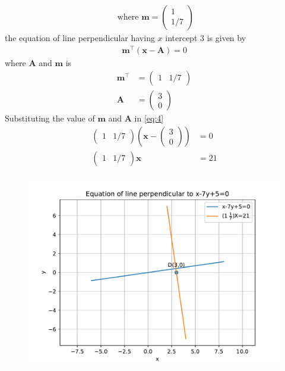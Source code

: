 \documentclass[12pt]{article}
\providecommand{\brak}[1]{\ensuremath{\left(#1\right)}}
\newcommand{\myvec}[1]{\ensuremath{\begin{pmatrix}#1\end{pmatrix}}}
\let\vec\mathbf
\begin{document}
\begin{enumerate}
\begin{align}
	\text{ where }
		\vec{m} = \myvec{1\\1/7}
\end{align}
the equation of line perpendicular having $x$ intercept $3$ is given by 
\begin{align}
	\vec{m}^\top\brak{\vec{x}-\vec{A}}=0
\end{align}
		where $\vec{A}$ and $\vec{m}$ is 
\begin{align}
	\vec{m}^\top &=\myvec{1 & 1/7}\\
	\vec{A} &=\myvec{3\\0}
\end{align}
Substituting the value of $\vec{m}$ and $\vec{A}$ in \eqref{eq:4}
		\begin{align}
			\myvec{1 & 1/7}\brak{\vec{x}-\myvec{3\\0}} &=0\\
			\myvec{1 & 1/7}\vec{x} &= 21
		\end{align}
		\begin{figure}[!h]
\begin{center}
\includegraphics[width=\columnwidth]{figs/fig.pdf}
\end{center}
\caption{}
\label{fig:Fig1}
\end{figure}
\end{enumerate}
\end{document}
